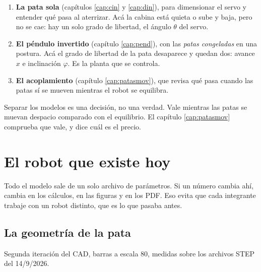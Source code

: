 \documentclass[11pt,a4paper]{report}
\begin{document}
\begin{enumerate}[leftmargin=1.6em]
\item \textbf{La pata sola} (capítulos \ref{cap:cin} y \ref{cap:din}), para dimensionar el
      servo y entender qué pasa al aterrizar. Acá la cabina está quieta o sube y baja, pero
      no se cae: hay un solo grado de libertad, el ángulo $\theta$ del servo.
\item \textbf{El péndulo invertido} (capítulo \ref{cap:pend}), con las \emph{patas
      congeladas} en una postura. Acá el grado de libertad de la pata desaparece y quedan
      dos: avance $x$ e inclinación $\varphi$. Es la planta que se controla.
\item \textbf{El acoplamiento} (capítulo \ref{cap:patasmov}), que revisa qué pasa cuando las
      patas sí se mueven mientras el robot se equilibra.
\end{enumerate}

\begin{ojo}
Separar los modelos es una decisión, no una verdad. Vale mientras las patas se muevan despacio
comparado con el equilibrio. El capítulo \ref{cap:patasmov} comprueba que vale, y dice cuál es
el precio.
\end{ojo}

\chapter{El robot que existe hoy}\label{cap:mapa2}

\begin{idea}
Todo el modelo sale de un solo archivo de parámetros. Si un número cambia ahí, cambia en los
cálculos, en las figuras y en los PDF. Eso evita que cada integrante trabaje con un robot
distinto, que es lo que pasaba antes.
\end{idea}

\section{La geometría de la pata}

Segunda iteración del CAD, barras a escala 80, medidas sobre los archivos STEP del 14/9/2026.
\end{document}
